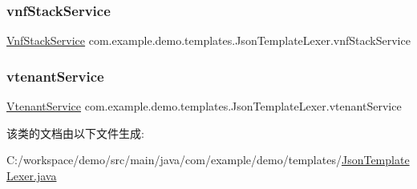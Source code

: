 \subsubsection{\texorpdfstring{vnf\+Stack\+Service}{vnfStackService}}
{\footnotesize\ttfamily \mbox{\hyperlink{classcom_1_1example_1_1demo_1_1service_1_1_vnf_stack_service}{Vnf\+Stack\+Service}} com.\+example.\+demo.\+templates.\+Json\+Template\+Lexer.\+vnf\+Stack\+Service\hspace{0.3cm}{\ttfamily [private]}}

\mbox{\label{classcom_1_1example_1_1demo_1_1templates_1_1_json_template_lexer_ab3064daa9ed5931e3e58cf1821044624}} 
\subsubsection{\texorpdfstring{vtenant\+Service}{vtenantService}}
{\footnotesize\ttfamily \mbox{\hyperlink{classcom_1_1example_1_1demo_1_1service_1_1_vtenant_service}{Vtenant\+Service}} com.\+example.\+demo.\+templates.\+Json\+Template\+Lexer.\+vtenant\+Service\hspace{0.3cm}{\ttfamily [private]}}



该类的文档由以下文件生成\+:\begin{DoxyCompactItemize}
\item 
C\+:/workspace/demo/src/main/java/com/example/demo/templates/\mbox{\hyperlink{_json_template_lexer_8java}{Json\+Template\+Lexer.\+java}}\end{DoxyCompactItemize}
